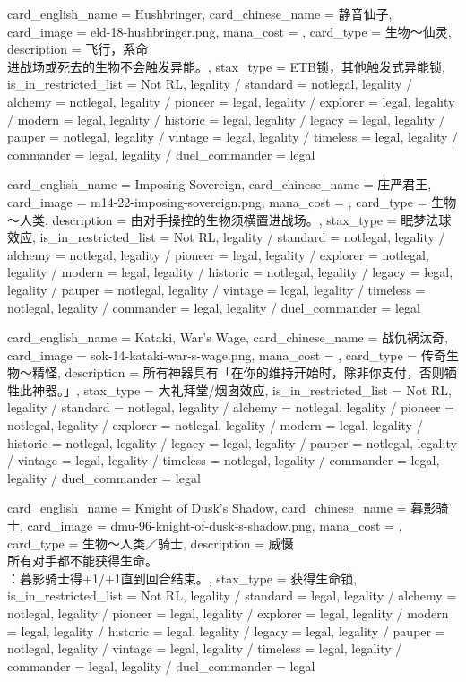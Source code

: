 \documentclass[lang = cn, color = black, 10pt]{AllThatStax}
\begin{document}
\card
{
	card_english_name = {Hushbringer},
	card_chinese_name = {静音仙子},
	card_image = eld-18-hushbringer.png,
	mana_cost = ,
	card_type = 生物～仙灵,
	description = {飞行，系命\\
进战场或死去的生物不会触发异能。},
	stax_type = ETB锁，其他触发式异能锁,
	is_in_restricted_list = Not RL,
	legality / standard = notlegal,
	legality / alchemy = notlegal,
	legality / pioneer = legal,
	legality / explorer = legal,
	legality / modern = legal,
	legality / historic = legal,
	legality / legacy = legal,
	legality / pauper = notlegal,
	legality / vintage = legal,
	legality / timeless = legal,
	legality / commander = legal,
	legality / duel_commander = legal
}

\card
{
	card_english_name = {Imposing Sovereign},
	card_chinese_name = {庄严君王},
	card_image = m14-22-imposing-sovereign.png,
	mana_cost = ,
	card_type = 生物～人类,
	description = {由对手操控的生物须横置进战场。},
	stax_type = 眠梦法球效应,
	is_in_restricted_list = Not RL,
	legality / standard = notlegal,
	legality / alchemy = notlegal,
	legality / pioneer = legal,
	legality / explorer = notlegal,
	legality / modern = legal,
	legality / historic = notlegal,
	legality / legacy = legal,
	legality / pauper = notlegal,
	legality / vintage = legal,
	legality / timeless = notlegal,
	legality / commander = legal,
	legality / duel_commander = legal
}

\card
{
	card_english_name = {Kataki, War's Wage},
	card_chinese_name = {战仇祸汰奇},
	card_image = sok-14-kataki-war-s-wage.png,
	mana_cost = ,
	card_type = 传奇生物～精怪,
	description = {所有神器具有「在你的维持开始时，除非你支付，否则牺牲此神器。」},
	stax_type = 大礼拜堂/烟囱效应,
	is_in_restricted_list = Not RL,
	legality / standard = notlegal,
	legality / alchemy = notlegal,
	legality / pioneer = notlegal,
	legality / explorer = notlegal,
	legality / modern = legal,
	legality / historic = notlegal,
	legality / legacy = legal,
	legality / pauper = notlegal,
	legality / vintage = legal,
	legality / timeless = notlegal,
	legality / commander = legal,
	legality / duel_commander = legal
}

\card
{
	card_english_name = {Knight of Dusk's Shadow},
	card_chinese_name = {暮影骑士},
	card_image = dmu-96-knight-of-dusk-s-shadow.png,
	mana_cost = ,
	card_type = 生物～人类／骑士,
	description = {威慑\\
所有对手都不能获得生命。\\
：暮影骑士得+1/+1直到回合结束。},
	stax_type = 获得生命锁,
	is_in_restricted_list = Not RL,
	legality / standard = legal,
	legality / alchemy = notlegal,
	legality / pioneer = legal,
	legality / explorer = legal,
	legality / modern = legal,
	legality / historic = legal,
	legality / legacy = legal,
	legality / pauper = notlegal,
	legality / vintage = legal,
	legality / timeless = legal,
	legality / commander = legal,
	legality / duel_commander = legal
}
\end{document}
